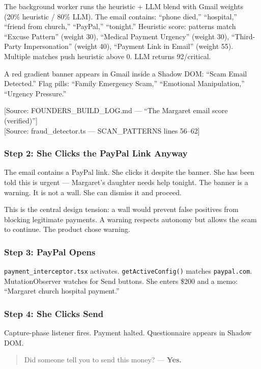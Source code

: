 \documentclass[11pt, letterpaper]{article}
\newcommand{\source}[1]{\textcolor{citation}{[Source: #1]}}
\begin{document}
  The background worker runs the heuristic + LLM blend with Gmail weights (20\% heuristic / 80\% LLM). The email contains: ``phone died,'' ``hospital,'' ``friend from church,'' ``PayPal,'' ``tonight.'' Heuristic score: patterns match ``Excuse Pattern'' (weight 30), ``Medical Payment Urgency'' (weight 30), ``Third-Party Impersonation'' (weight 40), ``Payment Link in Email'' (weight 55). Multiple matches push heuristic above 0. LLM returns 92/critical.

  A red gradient banner appears in Gmail inside a Shadow DOM: ``Scam Email Detected.'' Flag pills: ``Family Emergency Scam,'' ``Emotional Manipulation,'' ``Urgency Pressure.''

  \source{FOUNDERS\_BUILD\_LOG.md --- ``The Margaret email score (verified)''}\\
  \source{fraud\_detector.ts --- SCAN\_PATTERNS lines 56--62}

  \subsubsection{Step 2: She Clicks the PayPal Link Anyway}

  The email contains a PayPal link. She clicks it despite the banner. She has been told this is urgent --- Margaret's daughter needs help tonight. The banner is a warning. It is not a wall. She can dismiss it and proceed.

  This is the central design tension: a wall would prevent false positives from blocking legitimate payments. A warning respects autonomy but allows the scam to continue. The product chose warning.

  \subsubsection{Step 3: PayPal Opens}

  \texttt{payment\_interceptor.tsx} activates. \texttt{getActiveConfig()} matches \texttt{paypal.com}. MutationObserver watches for Send buttons. She enters \$200 and a memo: ``Margaret church hospital payment.''

  \subsubsection{Step 4: She Clicks Send}

  Capture-phase listener fires. Payment halted. Questionnaire appears in Shadow DOM.

  \begin{quote}
  Did someone tell you to send this money? --- \textbf{Yes.}
  \end{quote}
\end{document}
